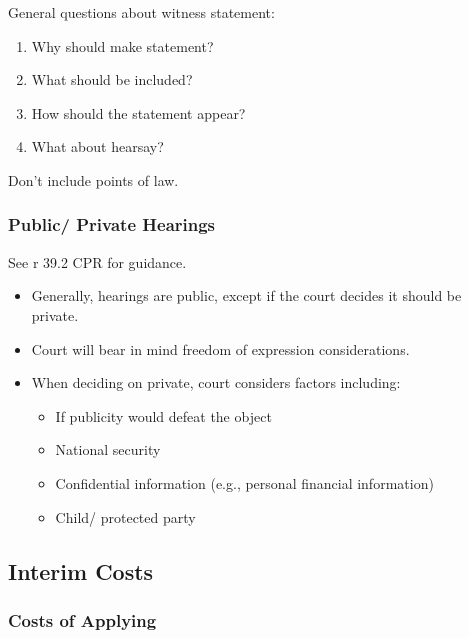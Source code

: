 \documentclass[
]{article}
\providecommand{\tightlist}{%
  \setlength{\itemsep}{0pt}\setlength{\parskip}{0pt}}
\begin{document}
General questions about witness statement:

\begin{enumerate}
\def\labelenumi{\arabic{enumi}.}
\tightlist
\item
  Why should make statement?
\item
  What should be included?
\item
  How should the statement appear?
\item
  What about hearsay?
\end{enumerate}

Don't include points of law.

\hypertarget{public-private-hearings}{%
\subsubsection{Public/ Private Hearings}\label{public-private-hearings}}

See r 39.2 CPR for guidance.

\begin{itemize}
\tightlist
\item
  Generally, hearings are public, except if the court decides it should
  be private.
\item
  Court will bear in mind freedom of expression considerations.
\item
  When deciding on private, court considers factors including:

  \begin{itemize}
  \tightlist
  \item
    If publicity would defeat the object
  \item
    National security
  \item
    Confidential information (e.g., personal financial information)
  \item
    Child/ protected party
  \end{itemize}
\end{itemize}

\hypertarget{interim-costs}{%
\subsection{Interim Costs}\label{interim-costs}}

\hypertarget{costs-of-applying}{%
\subsubsection{Costs of Applying}\label{costs-of-applying}}
\end{document}
